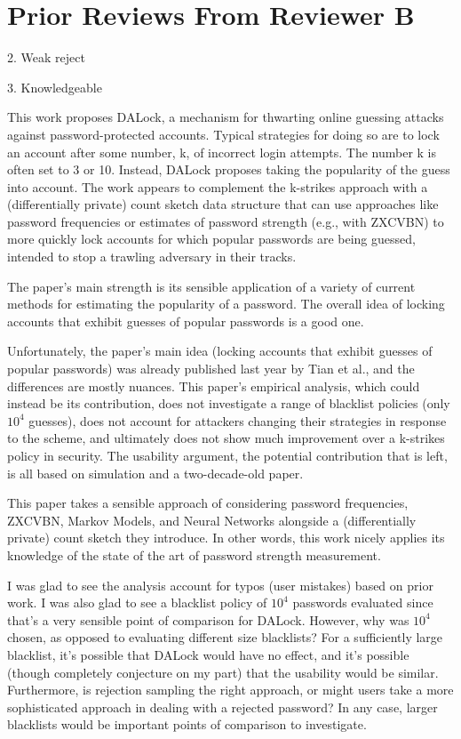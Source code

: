 \section{Prior Reviews From Reviewer B}

2. Weak reject

3. Knowledgeable

This work proposes DALock, a mechanism for thwarting online guessing attacks against password-protected accounts. Typical strategies for doing so are to lock an account after some number, k, of incorrect login attempts. The number k is often set to 3 or 10. Instead, DALock proposes taking the popularity of the guess into account. The work appears to complement the k-strikes approach with a (differentially private) count sketch data structure that can use approaches like password frequencies or estimates of password strength (e.g., with ZXCVBN) to more quickly lock accounts for which popular passwords are being guessed, intended to stop a trawling adversary in their tracks.

The paper's main strength is its sensible application of a variety of current methods for estimating the popularity of a password. The overall idea of locking accounts that exhibit guesses of popular passwords is a good one.

Unfortunately, the paper's main idea (locking accounts that exhibit guesses of popular passwords) was already published last year by Tian et al., and the differences are mostly nuances. This paper's empirical analysis, which could instead be its contribution, does not investigate a range of blacklist policies (only $10^{4}$ guesses), does not account for attackers changing their strategies in response to the scheme, and ultimately does not show much improvement over a k-strikes policy in security. The usability argument, the potential contribution that is left, is all based on simulation and a two-decade-old paper.


This paper takes a sensible approach of considering password frequencies, ZXCVBN, Markov Models, and Neural Networks alongside a (differentially private) count sketch they introduce. In other words, this work nicely applies its knowledge of the state of the art of password strength measurement.

I was glad to see the analysis account for typos (user mistakes) based on prior work. I was also glad to see a blacklist policy of $10^{4}$ passwords evaluated since that's a very sensible point of comparison for DALock. However, why was $10^{4}$ chosen, as opposed to evaluating different size blacklists? For a sufficiently large blacklist, it's possible that DALock would have no effect, and it's possible (though completely conjecture on my part) that the usability would be similar. Furthermore, is rejection sampling the right approach, or might users take a more sophisticated approach in dealing with a rejected password? In any case, larger blacklists would be important points of comparison to investigate.

